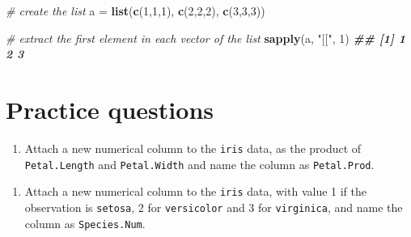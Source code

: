 \documentclass[
]{book}
\newenvironment{Shaded}{\begin{snugshade}}{\end{snugshade}}
\newcommand{\CommentTok}[1]{\textcolor[rgb]{0.56,0.35,0.01}{\textit{#1}}}
\newcommand{\DecValTok}[1]{\textcolor[rgb]{0.00,0.00,0.81}{#1}}
\newcommand{\DocumentationTok}[1]{\textcolor[rgb]{0.56,0.35,0.01}{\textbf{\textit{#1}}}}
\newcommand{\FunctionTok}[1]{\textcolor[rgb]{0.13,0.29,0.53}{\textbf{#1}}}
\newcommand{\NormalTok}[1]{#1}
\newcommand{\OtherTok}[1]{\textcolor[rgb]{0.56,0.35,0.01}{#1}}
\newcommand{\SpecialCharTok}[1]{\textcolor[rgb]{0.81,0.36,0.00}{\textbf{#1}}}
\newcommand{\StringTok}[1]{\textcolor[rgb]{0.31,0.60,0.02}{#1}}
\providecommand{\tightlist}{%
  \setlength{\itemsep}{0pt}\setlength{\parskip}{0pt}}
\theoremstyle{definition}
\theoremstyle{definition}
\theoremstyle{definition}
\theoremstyle{definition}
\theoremstyle{remark}
\begin{document}
\begin{Shaded}
\begin{Highlighting}[]
    \CommentTok{\# create the list}
\NormalTok{    a }\OtherTok{=} \FunctionTok{list}\NormalTok{(}\FunctionTok{c}\NormalTok{(}\DecValTok{1}\NormalTok{,}\DecValTok{1}\NormalTok{,}\DecValTok{1}\NormalTok{), }\FunctionTok{c}\NormalTok{(}\DecValTok{2}\NormalTok{,}\DecValTok{2}\NormalTok{,}\DecValTok{2}\NormalTok{), }\FunctionTok{c}\NormalTok{(}\DecValTok{3}\NormalTok{,}\DecValTok{3}\NormalTok{,}\DecValTok{3}\NormalTok{))}
    
    \CommentTok{\# extract the first element in each vector of the list}
    \FunctionTok{sapply}\NormalTok{(a, }\StringTok{"[["}\NormalTok{, }\DecValTok{1}\NormalTok{)}
\DocumentationTok{\#\# [1] 1 2 3}
\end{Highlighting}
\end{Shaded}

\hypertarget{practice-questions}{%
\section{Practice questions}\label{practice-questions}}

\begin{enumerate}
\def\labelenumi{\arabic{enumi}.}
\tightlist
\item
  Attach a new numerical column to the \texttt{iris} data, as the product of \texttt{Petal.Length} and \texttt{Petal.Width} and name the column as \texttt{Petal.Prod}.
\end{enumerate}

\begin{Shaded}
\end{Shaded}

\begin{enumerate}
\def\labelenumi{\arabic{enumi}.}
\setcounter{enumi}{1}
\tightlist
\item
  Attach a new numerical column to the \texttt{iris} data, with value 1 if the observation is \texttt{setosa}, 2 for \texttt{versicolor} and 3 for \texttt{virginica}, and name the column as \texttt{Species.Num}.
\end{enumerate}
\end{document}
